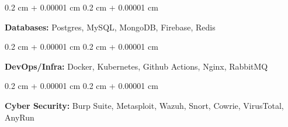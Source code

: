 \documentclass[10pt, letterpaper]{article}
\newenvironment{onecolentry}{
    \begin{adjustwidth}{
        0.2 cm + 0.00001 cm
    }{
        0.2 cm + 0.00001 cm
    }
}{
    \end{adjustwidth}
} %
\begin{document}
        \vspace{0.2 cm}

        \begin{onecolentry}
            \textbf{Databases:} Postgres, MySQL, MongoDB, Firebase, Redis
        \end{onecolentry}

        \vspace{0.2 cm}

        \begin{onecolentry}
            \textbf{DevOps/Infra:} Docker, Kubernetes, Github Actions, Nginx, RabbitMQ
        \end{onecolentry}
    
        \vspace{0.2 cm}

        \begin{onecolentry}
            \textbf{Cyber Security:} Burp Suite, Metasploit, Wazuh, Snort, Cowrie, VirusTotal, AnyRun
        \end{onecolentry}

    
\end{document}
